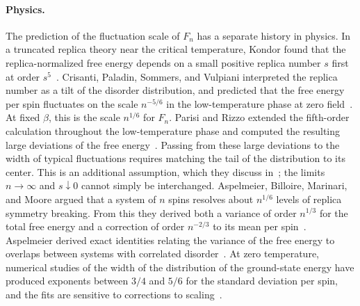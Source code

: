 \paragraph{Physics.}
The prediction of the fluctuation scale of $F_n$ has a separate history in
physics. In a truncated replica theory near the critical temperature, Kondor
found that the replica-normalized free energy depends on a small positive
replica number $s$ first at order $s^5$~\cite{kondor-1983}. Crisanti,
Paladin, Sommers, and Vulpiani interpreted the replica number as a tilt of
the disorder distribution, and predicted that the free energy per spin
fluctuates on the scale $n^{-5/6}$ in the low-temperature phase at zero
field~\cite{crisanti-paladin-sommers-vulpiani-1992}. At fixed $\beta$, this
is the scale $n^{1/6}$ for $F_n$. Parisi and Rizzo extended the fifth-order
calculation throughout the low-temperature phase and computed the resulting
large deviations of the free energy~\cite{parisi-rizzo-2008,parisi-rizzo-2009}.
Passing from these large deviations to the width of typical fluctuations
requires matching the tail of the distribution to its center. This is an
additional assumption, which they discuss
in~\cite[Section~VI]{parisi-rizzo-2009}; the limits $n\to\infty$ and
$s\downarrow0$ cannot simply be interchanged.
Aspelmeier, Billoire, Marinari, and Moore argued that a system of $n$ spins
resolves about $n^{1/6}$ levels of replica symmetry breaking. From this they
derived both a variance of order $n^{1/3}$ for the total free energy and a
correction of order $n^{-2/3}$ to its mean per
spin~\cite[Section~2]{aspelmeier-billoire-marinari-moore-2008}. Aspelmeier
derived exact identities relating the variance of the free energy to
overlaps between systems with correlated disorder~\cite{aspelmeier-2008}. At
zero temperature, numerical studies of the width of the distribution of the
ground-state energy have produced exponents between $3/4$ and $5/6$ for the
standard deviation per spin, and the fits are sensitive to corrections to
scaling~\cite{bouchaud-krzakala-martin-2003,boettcher-2005,boettcher-2010,palassini-2008}.

